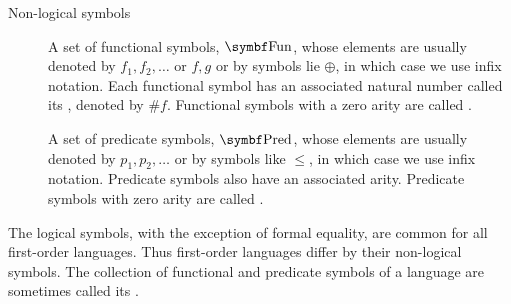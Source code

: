 \begin{definition}
\begin{description}
    \item[Non-logical symbols]\mbox{}
    \begin{defenum}[resume=def:first_order_language]
       A set of functional symbols, \( \bfop{Fun} \), whose elements are usually denoted by \( f_1, f_2, \ldots \) or \( f, g \) or by symbols lie \( \oplus \), in which case we use infix notation. Each functional symbol has an associated natural number called its , denoted by \( \# f \). Functional symbols with a zero arity are called .

       A set of predicate symbols, \( \bfop{Pred} \), whose elements are usually denoted by \( p_1, p_2, \ldots \) or by symbols like \( \leq \), in which case we use infix notation. Predicate symbols also have an associated arity. Predicate symbols with zero arity are called .
    \end{defenum}
  \end{description}

  The logical symbols, with the exception of formal equality, are common for all first-order languages. Thus first-order languages differ by their non-logical symbols. The collection of functional and predicate symbols of a language are sometimes called its .
\end{definition}

